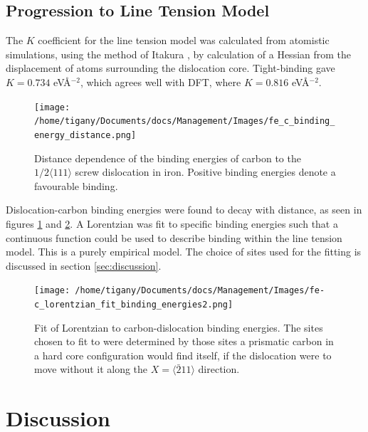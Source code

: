 \documentclass[a4paper,11pt]{article}
\begin{document}
\subsection{Progression to Line Tension Model}
\label{sec:orge944ce3}


The \(K\) coefficient for the line tension model was calculated from atomistic simulations, using
the method of Itakura \cite{Itakura2012}, by calculation of a Hessian from the displacement of
atoms surrounding the dislocation core. Tight-binding gave \(K = 0.734\) eV\AA{}\(^{-2}\), which agrees well
with DFT, where \(K = 0.816\) eV\AA{}\(^{-2}\).


\begin{figure}[htbp]

\texttt{[image: /home/tigany/Documents/docs/Management/Images/fe\_c\_binding\_energy\_distance.png]}
\caption{Distance dependence of the binding energies of carbon to the \(1/2\langle 111 \rangle\) screw dislocation in iron. Positive binding energies denote a favourable binding. \label{distancedep}}
\end{figure}

Dislocation-carbon binding energies were found to decay with distance, as seen in figures
\ref{distancedep} and \ref{lorentzianfit}. A Lorentzian was fit to specific binding energies such
that a continuous function could be used to describe binding within
the line tension model. This is a purely empirical model. The
choice of sites used for the fitting is discussed in section \ref{sec:discussion}.




\begin{figure}[htbp]

\texttt{[image: /home/tigany/Documents/docs/Management/Images/fe-c\_lorentzian\_fit\_binding\_energies2.png]}
\caption{Fit of Lorentzian to carbon-dislocation binding energies. The sites chosen to fit to were determined by those sites a prismatic carbon in a hard core configuration would find itself, if the dislocation were to move without it along the \(X = \langle\bar{2}11\rangle\) direction. \label{lorentzianfit}}
\end{figure}



\section{Discussion}
\label{sec:org2814227}
\label{sec:discussion}
\end{document}
